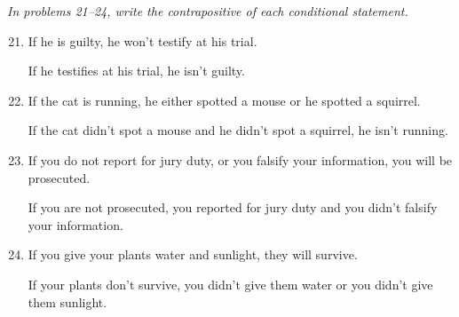 \emph{In problems 21--24, write the contrapositive of each conditional statement.}
\begin{enumerate}
\setcounter{enumi}{20}

\item If he is guilty, he won't testify at his trial. \\ 
\begin{framed}
If he testifies at his trial, he isn't guilty.
\end{framed}

\item If the cat is running, he either spotted a mouse or he spotted a squirrel. \\ 
\begin{framed}
If the cat didn't spot a mouse and he didn't spot a squirrel, he isn't running.
\end{framed}

\item If you do not report for jury duty, or you falsify your information, you will be prosecuted. \\ 
\begin{framed}
If you are not prosecuted, you reported for jury duty and you didn't falsify your information.
\end{framed}

\item If you give your plants water and sunlight, they will survive. \\ 
\begin{framed}
If your plants don't survive, you didn't give them water or you didn't give them sunlight.
\end{framed}
\end{enumerate}